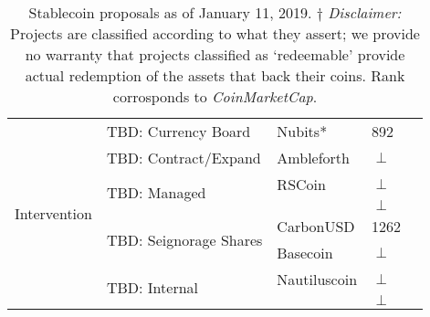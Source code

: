 \begin{table}[t]
\begin{tabular}{|l|l|l|l|l|}
\multirow{8}{*}{Intervention}                                                           
						& \multirow{1}{*}{TBD: Currency Board} 							& Nubits* 			& 892 \\ \cline{2-4}
						& \multirow{1}{*}{TBD: Contract/Expand}  						& Ambleforth		& $\perp$  \\ \cline{2-4}
						& \multirow{2}{*}{TBD: Managed}  								& RSCoin 			& $\perp$  \\ \cline{3-4}
						&														&  				& $\perp$ \\ \cline{2-4}
						& \multirow{2}{*}{TBD: Seignorage Shares}  						& CarbonUSD		& 1262 \\ \cline{3-4}
						&														& Basecoin 		& $\perp$ \\ \cline{2-4}
						& \multirow{2}{*}{TBD: Internal }  								& Nautiluscoin 		& $\perp$ \\ \cline{3-4}
						&														&  				& $\perp$ \\ \cline{2-4}
\hline
\end{tabular}
\caption{Stablecoin proposals as of January 11, 2019. $\dagger$ \textit{Disclaimer:} Projects are classified according to what they assert; \eg we provide no warranty that projects classified as `redeemable' provide actual redemption of the assets that back their coins. Rank corrosponds to \textit{CoinMarketCap}.\label{tab:stablecoins}}
\end{table}




